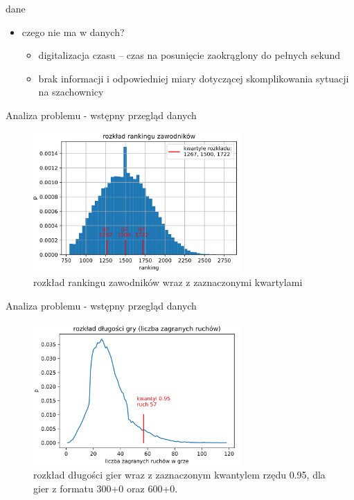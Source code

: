 \documentclass{beamer}
\begin{document}
\begin{frame}{dane}
		\begin{itemize}
	\item czego nie ma w danych?
		\begin{itemize}
		\item digitalizacja czasu -- czas na posunięcie zaokrąglony do pełnych sekund
		\item brak informacji i odpowiedniej miary dotyczącej skomplikowania sytuacji na szachownicy
	\end{itemize}
	\end{itemize}
\end{frame}



\begin{frame}{Analiza problemu - wstępny przegląd danych}

	\begin{figure}[H]
		\centering
		\includegraphics[width=8cm]{../Formatka/ranking.png}
		\caption{rozkład rankingu zawodników wraz z zaznaczonymi kwartylami}
		\label{rys:rozklad_elo}
	\end{figure}
\end{frame}

\begin{frame}{Analiza problemu - wstępny przegląd danych}
	\begin{figure}[H]
		\centering
		\includegraphics[width=8cm]{../Formatka/dlugosc_gry.png}
		\caption{rozkład długości gier wraz z zaznaczonym kwantylem rzędu 0.95,  dla gier z formatu 300+0 oraz 600+0.}
		\label{rys:dlugosc_gier}
	\end{figure}
\end{frame}
\end{document}
